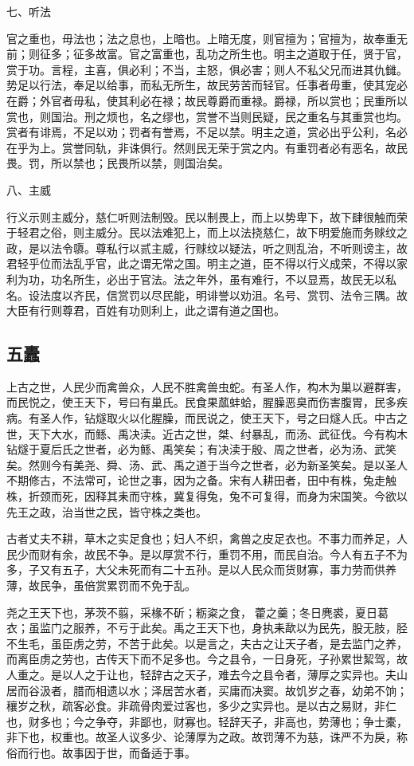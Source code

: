 \documentclass[]{article}
\begin{document}
七、听法

官之重也，毋法也；法之息也，上暗也。上暗无度，则官擅为；官擅为，故奉重无前；则征多；征多故富。官之富重也，乱功之所生也。明主之道取于任，贤于官，赏于功。言程，主喜，俱必利；不当，主怒，俱必害；则人不私父兄而进其仇雠。势足以行法，奉足以给事，而私无所生，故民劳苦而轻官。任事者毋重，使其宠必在爵；外官者毋私，使其利必在禄；故民尊爵而重禄。爵禄，所以赏也；民重所以赏也，则国治。刑之烦也，名之缪也，赏誉不当则民疑，民之重名与其重赏也均。赏者有诽焉，不足以劝；罚者有誉焉，不足以禁。明主之道，赏必出乎公利，名必在乎为上。赏誉同轨，非诛俱行。然则民无荣于赏之内。有重罚者必有恶名，故民畏。罚，所以禁也；民畏所以禁，则国治矣。

八、主威

行义示则主威分，慈仁听则法制毁。民以制畏上，而上以势卑下，故下肆很触而荣于轻君之俗，则主威分。民以法难犯上，而上以法挠慈仁，故下明爱施而务赇纹之政，是以法令隳。尊私行以贰主威，行赇纹以疑法，听之则乱治，不听则谤主，故君轻乎位而法乱乎官，此之谓无常之国。明主之道，臣不得以行义成荣，不得以家利为功，功名所生，必出于官法。法之年外，虽有难行，不以显焉，故民无以私名。设法度以齐民，信赏罚以尽民能，明诽誉以劝沮。名号、赏罚、法令三隅。故大臣有行则尊君，百姓有功则利上，此之谓有道之国也。

\hypertarget{header-n1592}{%
\subsection{五蠹}\label{header-n1592}}

上古之世，人民少而禽兽众，人民不胜禽兽虫蛇。有圣人作，构木为巢以避群害，而民悦之，使王天下，号曰有巢氏。民食果蓏蚌蛤，腥臊恶臭而伤害腹胃，民多疾病。有圣人作，钻燧取火以化腥臊，而民说之，使王天下，号之曰燧人氏。中古之世，天下大水，而鲧、禹决渎。近古之世，桀、纣暴乱，而汤、武征伐。今有构木钻燧于夏后氏之世者，必为鲧、禹笑矣；有决渎于殷、周之世者，必为汤、武笑矣。然则今有美尧、舜、汤、武、禹之道于当今之世者，必为新圣笑矣。是以圣人不期修古，不法常可，论世之事，因为之备。宋有人耕田者，田中有株，兔走触株，折颈而死，因释其耒而守株，冀复得兔，兔不可复得，而身为宋国笑。今欲以先王之政，治当世之民，皆守株之类也。

古者丈夫不耕，草木之实足食也；妇人不织，禽兽之皮足衣也。不事力而养足，人民少而财有余，故民不争。是以厚赏不行，重罚不用，而民自治。今人有五子不为多，子又有五子，大父未死而有二十五孙。是以人民众而货财寡，事力劳而供养薄，故民争，虽倍赏累罚而不免于乱。

尧之王天下也，茅茨不翦，采椽不斫；粝粢之食，藿之羹；冬日麂裘，夏日葛衣；虽监门之服养，不亏于此矣。禹之王天下也，身执耒歃以为民先，股无肢，胫不生毛，虽臣虏之劳，不苦于此矣。以是言之，夫古之让天子者，是去监门之养，而离臣虏之劳也，古传天下而不足多也。今之县令，一日身死，子孙累世絜驾，故人重之。是以人之于让也，轻辞古之天子，难去今之县令者，薄厚之实异也。夫山居而谷汲者，腊而相遗以水；泽居苦水者，买庸而决窦。故饥岁之春，幼弟不饷；穰岁之秋，疏客必食。非疏骨肉爱过客也，多少之实异也。是以古之易财，非仁也，财多也；今之争夺，非鄙也，财寡也。轻辞天子，非高也，势薄也；争士橐，非下也，权重也。故圣人议多少、论薄厚为之政。故罚薄不为慈，诛严不为戾，称俗而行也。故事因于世，而备适于事。
\end{document}
